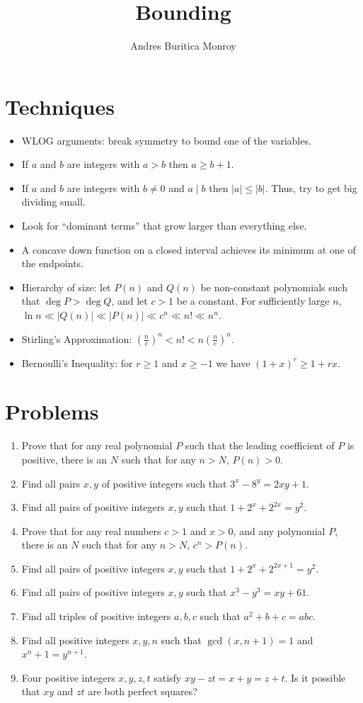 \documentclass{article}
\title{Bounding}
\author{Andres Buritica Monroy}
\date{}
\begin{document}
\maketitle
\section{Techniques}
\begin{itemize}
  \item WLOG arguments: break symmetry to bound one of the variables.
  \item If $a$ and $b$ are integers with $a>b$ then $a\ge b+1$.
  \item If $a$ and $b$ are integers with $b\ne 0$ and $a\mid b$ then
    $|a|\le|b|$. Thus, try to get big dividing small.
  \item Look for ``dominant terms'' that grow larger than everything else.
  \item A concave down function on a closed interval
    achieves its minimum at one of the endpoints.
  \item Hierarchy of size: let $P(n)$ and $Q(n)$ be non-constant polynomials such that $\deg
    P>\deg Q$, and let $c>1$ be a constant. For sufficiently large $n$,
    $\ln n\ll|Q(n)|\ll|P(n)|\ll c^n\ll n!\ll n^n$.
  \item Stirling's Approximation: $\left(\frac ne\right)^n<n!<n\left(\frac
    ne\right)^n$.
  \item Bernoulli's Inequality: for $r\ge 1$ and $x\ge -1$ we have $(1+x)^r\ge
    1+rx$.
\end{itemize}
\section{Problems}
\begin{enumerate}
  \item Prove that for any real polynomial $P$ such that the leading coefficient
    of $P$ is positive, there is an $N$ such that for any $n>N$, $P(n)>0$.
  \item Find all pairs $x,y$ of positive integers such that $3^x-8^y=2xy+1$.
  \item Find all pairs of positive integers $x,y$ such that
    $1+2^x+2^{2x}=y^2$.
  \item Prove that for any real numbers $c>1$ and $x>0$, and any polynomial $P$,
    there is an $N$ such that for any $n>N$, $c^n>P(n)$.
  \item Find all pairs of positive integers $x,y$ such that
    $1+2^x+2^{2x+1}=y^2$.
  \item Find all pairs of positive integers $x,y$ such that $x^3-y^3=xy+61$.
  \item Find all triples of positive integers $a,b,c$ such that $a^2+b+c=abc$.
  \item Find all positive integers $x,y,n$ such that $\gcd(x,n+1)=1$ and
    $x^n+1=y^{n+1}$.
  \item Four positive integers $x,y,z,t$ satisfy $xy-zt=x+y=z+t$. Is it possible
    that $xy$ and $zt$ are both perfect squares?
\end{enumerate}
\newpage
\end{document}
